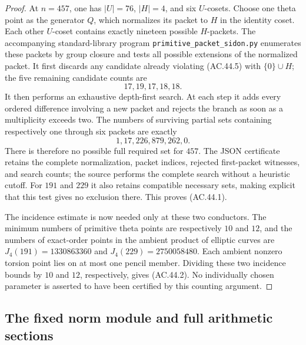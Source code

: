 \begin{proof}
At \(n=457\), one has \(|U|=76\), \(|H|=4\), and six
\(U\)-cosets. Choose one theta point as the generator \(Q\),
which normalizes its packet to \(H\) in the identity coset.
Each other \(U\)-coset contains exactly nineteen possible
\(H\)-packets. The accompanying standard-library program
\texttt{primitive\_packet\_sidon.py} enumerates these packets by
group closure and tests all possible extensions of the normalized
packet. It first discards any candidate already violating
(AC.44.5) with \(\{0\}\cup H\); the five remaining candidate
counts are
\[
                            17,19,17,18,18.
\]
It then performs an exhaustive depth-first search. At each step
it adds every ordered difference involving a new packet and
rejects the branch as soon as a multiplicity exceeds two.
The numbers of surviving partial sets containing respectively
one through six packets are exactly
\[
                         1,17,226,879,262,0.
\tag{AC.44.6}
\]
There is therefore no possible full required set for \(457\).
The JSON certificate retains the complete normalization, packet
indices, rejected first-packet witnesses, and search counts;
the source performs the complete search without a heuristic cutoff.
For \(191\) and \(229\) it also retains compatible necessary
sets, making explicit that this test gives no exclusion there.
This proves (AC.44.1).

The incidence estimate is now needed only at these two conductors.
The minimum numbers of primitive theta points are respectively
\(10\) and \(12\), and the numbers of exact-order points in
the ambient product of elliptic curves are
\(J_4(191)=1330863360\) and \(J_4(229)=2750058480\).
Each ambient nonzero torsion point lies on at most one pencil
member. Dividing these two incidence bounds by \(10\) and
\(12\), respectively, gives (AC.44.2). No individually chosen
parameter is asserted to have been certified by this counting
argument.
\end{proof}


\subsection{The fixed norm module and full arithmetic sections}

